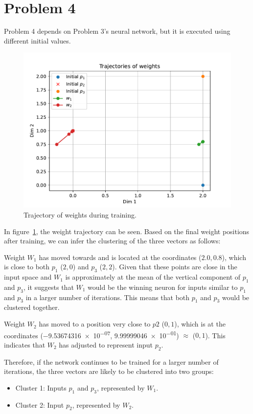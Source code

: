 \section{Problem 4}

Problem 4 depends on Problem 3's neural network, but it is executed using different initial values.

\begin{figure}[htpb]
	\centering
	\includegraphics[width=0.5\linewidth]{../Problem 4/prob4_weights_over_epoch.pdf}
	\caption{Trajectory of weights during training.}
	\label{fig:prob4_weight_trajectory}
\end{figure}

In figure~\ref{fig:prob4_weight_trajectory}, the weight trajectory can be seen.
Based on the final weight positions after training, we can infer the clustering of the three vectors as follows:

Weight $W_1$ has moved towards and is located at the coordinates ($2.0, 0.8$), which is close to both $p_1$ ($2, 0$) and $p_3$ ($2, 2$). Given that these points are close in the input space and $W_1$ is approximately at the mean of the vertical component of $p_1$ and $p_3$, it suggests that $W_1$ would be the winning neuron for inputs similar to $p_1$ and $p_3$ in a larger number of iterations. This means that both $p_1$ and $p_3$ would be clustered together.

Weight $W_2$ has moved to a position very close to $p2$ ($0, 1$), which is at the coordinates (\num{-9.53674316e-07}, \num{9.99999046e-01}) $\approx$ ($0,1$). This indicates that $W_2$ has adjusted to represent input $p_2$.

Therefore, if the network continues to be trained for a larger number of iterations, the three vectors are likely to be clustered into two groups:

\begin{itemize}
	\item Cluster 1: Inputs $p_1$ and $p_3$, represented by $W_1$.
	\item Cluster 2: Input $p_2$, represented by $W_2$.
\end{itemize}
